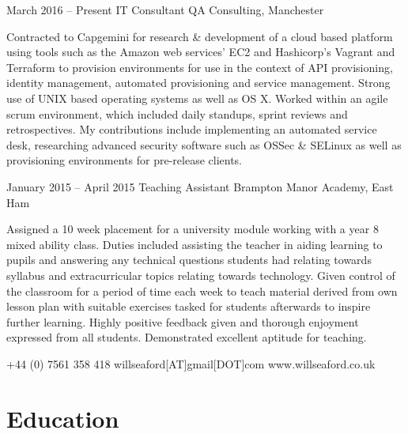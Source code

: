 \documentclass{tccv}
\begin{document}
\begin{eventlist}

\item{March 2016 -- Present}
     {IT Consultant}
     {QA Consulting, Manchester}

Contracted to Capgemini for research \& development of a cloud based platform using tools such as the Amazon web services’ EC2 and Hashicorp’s Vagrant and Terraform to provision environments for use in the context of API provisioning, identity management, automated provisioning and service management.
\newline
\newline
Strong use of UNIX based operating systems as well as OS X. Worked within an agile scrum environment, which included daily standups, sprint reviews and retrospectives. My contributions include implementing an automated service desk, researching advanced security software such as OSSec \& SELinux as well as provisioning environments for pre-release clients. 

\item{January 2015 -- April 2015}
	 {Teaching Assistant}
	 {Brampton Manor Academy, East Ham}
	 
Assigned a 10 week placement for a university module working with a year 8 mixed ability class. Duties included assisting the teacher in aiding learning to pupils and answering any technical questions students had relating towards syllabus and extracurricular topics relating towards technology.  
\newline
\newline
Given control of the classroom for a period of time each week to teach material derived from own lesson plan with suitable exercises tasked for students afterwards to inspire further learning. Highly positive feedback given and
thorough enjoyment expressed from all students. Demonstrated excellent aptitude for teaching.

\end{eventlist}

    {+44 (0) 7561 358 418}
    {willseaford[AT]gmail[DOT]com}
    {www.willseaford.co.uk}

\section{Education}
\end{document}
